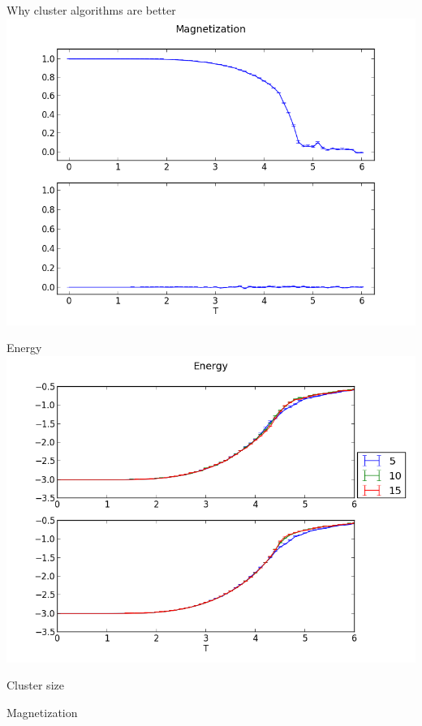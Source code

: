 \documentclass[]{beamer}
\begin{document}
\begin{frame}{Why cluster algorithms are better}
\includegraphics[width=\textwidth]{img/comp_magnetization.png}
\end{frame}

\begin{frame}{Energy}
\includegraphics[width=\textwidth]{../results/measurements/energy.png}
\end{frame}

\begin{frame}{Cluster size}
\end{frame}

\begin{frame}{Magnetization}
\end{frame}
\end{document}
